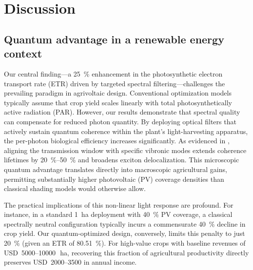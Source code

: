 
\section{Discussion}\label{sec:Discussion}

\subsection{Quantum advantage in a renewable energy context}

Our central finding---a \SI{25}{\percent} enhancement in the photosynthetic electron transport rate (ETR) driven by targeted spectral filtering---challenges the prevailing paradigm in agrivoltaic design. Conventional optimization models typically assume that crop yield scales linearly with total photosynthetically active radiation (PAR). However, our results demonstrate that spectral quality can compensate for reduced photon quantity. By deploying optical filters that actively sustain quantum coherence within the plant's light-harvesting apparatus, the per-photon biological efficiency increases significantly. As evidenced in , aligning the transmission window with specific vibronic modes extends coherence lifetimes by \SIrange{20}{50}{\percent} and broadens exciton delocalization. This microscopic quantum advantage translates directly into macroscopic agricultural gains, permitting substantially higher photovoltaic (PV) coverage densities than classical shading models would otherwise allow.

The practical implications of this non-linear light response are profound. For instance, in a standard \SI{1}{\hectare} deployment with \SI{40}{\percent} PV coverage, a classical spectrally neutral configuration typically incurs a commensurate \SI{40}{\percent} decline in crop yield. Our quantum-optimized design, conversely, limits this penalty to just \SI{20}{\percent} (given an ETR of \SI{80.51}{\percent}). For high-value crops with baseline revenues of USD~\numrange{5000}{10000}\,\si{\per\hectare}, recovering this fraction of agricultural productivity directly preserves USD~\numrange{2000}{3500} in annual income.

